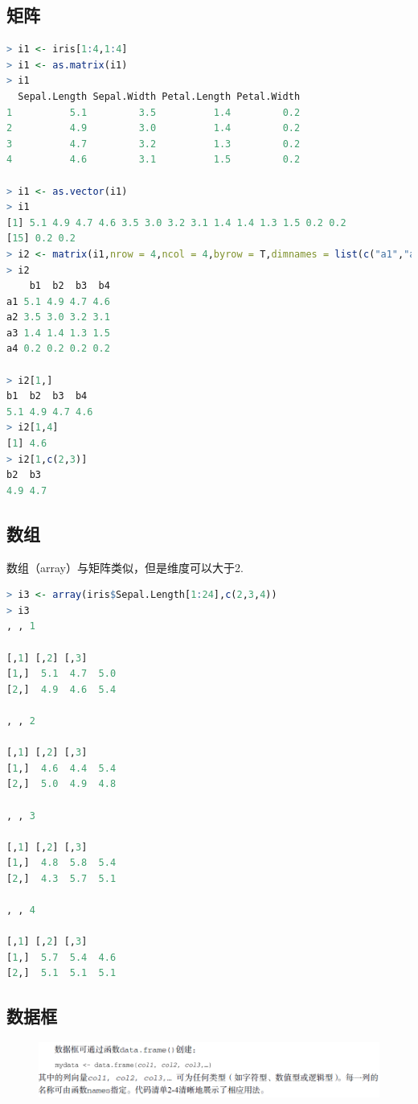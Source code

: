 \documentclass[11pt,a4paper,oneside]{book}
\begin{document}
\subsection{矩阵}

\begin{lstlisting}[language=R]
> i1 <- iris[1:4,1:4]
> i1 <- as.matrix(i1)
> i1
  Sepal.Length Sepal.Width Petal.Length Petal.Width
1          5.1         3.5          1.4         0.2
2          4.9         3.0          1.4         0.2
3          4.7         3.2          1.3         0.2
4          4.6         3.1          1.5         0.2

> i1 <- as.vector(i1)
> i1
[1] 5.1 4.9 4.7 4.6 3.5 3.0 3.2 3.1 1.4 1.4 1.3 1.5 0.2 0.2
[15] 0.2 0.2
> i2 <- matrix(i1,nrow = 4,ncol = 4,byrow = T,dimnames = list(c("a1","a2","a3","a4"),c("b1","b2","b3","b4")))
> i2
    b1  b2  b3  b4
a1 5.1 4.9 4.7 4.6
a2 3.5 3.0 3.2 3.1
a3 1.4 1.4 1.3 1.5
a4 0.2 0.2 0.2 0.2

> i2[1,]
b1  b2  b3  b4 
5.1 4.9 4.7 4.6 
> i2[1,4]
[1] 4.6
> i2[1,c(2,3)]
b2  b3 
4.9 4.7 
\end{lstlisting}

\subsection{数组}

数组（array）与矩阵类似，但是维度可以大于2.

\begin{lstlisting}[language=R]
> i3 <- array(iris$Sepal.Length[1:24],c(2,3,4))
> i3
, , 1

[,1] [,2] [,3]
[1,]  5.1  4.7  5.0
[2,]  4.9  4.6  5.4

, , 2

[,1] [,2] [,3]
[1,]  4.6  4.4  5.4
[2,]  5.0  4.9  4.8

, , 3

[,1] [,2] [,3]
[1,]  4.8  5.8  5.4
[2,]  4.3  5.7  5.1

, , 4

[,1] [,2] [,3]
[1,]  5.7  5.4  4.6
[2,]  5.1  5.1  5.1
\end{lstlisting}
\subsection{数据框}

\begin{figure}[H]
	\centering
	\includegraphics[width=\textwidth]{screenshot002}
	\label{fig:screenshot002}
\end{figure}
\end{document}
